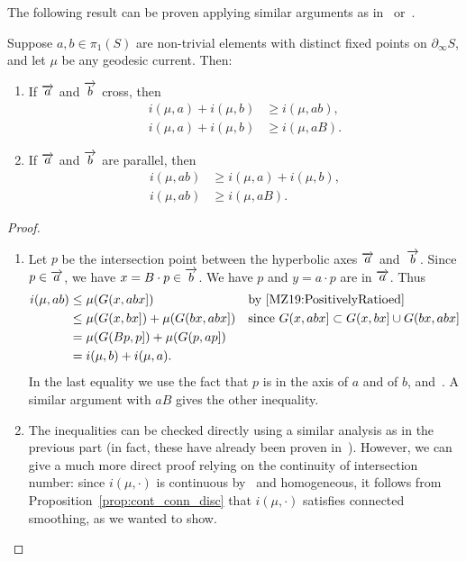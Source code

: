 The following result can be proven applying similar arguments as in~\cite[Lemma~4.4]{MZ19:PositivelyRatioed} or~\cite[Theorem~2.1]{FF22:QF}.

\begin{proposition}\label{prop:smoothing_nec}
Suppose $a,b \in \pi_1(S)$ are non-trivial elements with distinct fixed points on 
$\partial_{\infty} S$, and let $\mu$ be any geodesic current. Then:
\begin{enumerate}
\item If $\overrightarrow{a}$ and $\overrightarrow{b}$ cross, then
\[
\begin{aligned}
i(\mu,a)+i(\mu,b) &\ge i(\mu,ab),\\
i(\mu,a)+i(\mu,b) &\ge i(\mu,aB).
\end{aligned}
\]
\item If $\overrightarrow{a}$ and $\overrightarrow{b}$ are parallel, then
\[
\begin{aligned}
i(\mu,ab) &\ge i(\mu,a)+i(\mu,b),\\
i(\mu,ab) &\ge i(\mu,aB).
\end{aligned}
\]
\end{enumerate}
\end{proposition}

\begin{proof}
\begin{enumerate}
\item Let $p$ be the intersection point between the hyperbolic axes $\overrightarrow{a}$ and~$\overrightarrow{b}$.
Since $p \in \overrightarrow{a}$, we have $x=B \cdot p \in \overrightarrow{b}$.
We have $p$ and $y= a \cdot p$ are in $\overrightarrow{a}$. Thus
\begin{align*}
  i(\mu, ab) &\leq \mu(G(x, ab x]) &&\text{by \cite[Lemma 4.4(2)]{MZ19:PositivelyRatioed}}\\
  &\leq \mu(G(x, b x]) + \mu(G(bx, ab x]) &&\text{since $G(x, ab x] \subset G(x, b x] \cup G(bx, ab x]$}\\
             &= \mu(G(B p, p]) + \mu(G(p, ap])\\
               &= i(\mu, b) + i(\mu, a).
\end{align*}
In the last equality we use the fact that $p$ is in the
axis of $a$ and of $b$, and~\cite[Lemma 4.4(1)]{MZ19:PositivelyRatioed}.
A similar argument with $aB$ gives the other inequality.
\item
  The inequalities can be checked directly using a similar analysis as in the previous part (in fact, these have already been proven in~\cite[Proposition~4.5]{MZ19:PositivelyRatioed}).
However, we can give a much more direct proof relying on the continuity of intersection number: since $i(\mu, \cdot)$ is continuous by~\cite[Proposition~4.5]{Bonahon86:EndsHyperbolicManifolds} and homogeneous, it follows from Proposition~\ref{prop:cont_conn_disc} that $i(\mu, \cdot)$ satisfies connected smoothing, as we wanted to show.
\qedhere
\end{enumerate}
\end{proof}








